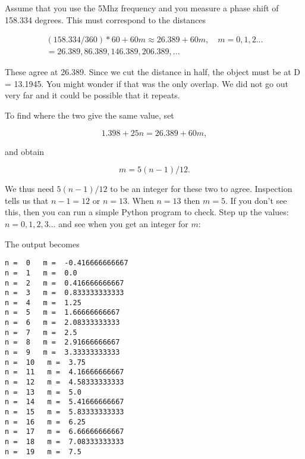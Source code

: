 Assume that you use the 5Mhz frequency and you measure a phase shift of
158.334 degrees. This must correspond to the distances

\[\begin{aligned}
(158.334/360)*60 + 60m \approx 26.389 +60m , \quad m=0,1,2 ...  \\
= 26.389, 86.389, 146.389, 206.389, ...
\end{aligned}\]

These agree at 26.389. Since we cut the distance in half, the object
must be at D = 13.1945. You might wonder if that was the only overlap.
We did not go out very far and it could be possible that it repeats.

To find where the two give the same value, set

\[1.398 + 25n = 26.389 + 60m,\]

and obtain

\[m = 5(n-1)/12.\]

We thus need \(5(n-1)/12\) to be an integer for these two to agree.
Inspection tells us that \(n-1 = 12\) or \(n=13\). When \(n=13\) then
\(m=5\). If you don't see this, then you can run a simple Python program
to check. Step up the values: \(n=0,1,2,3 ...\) and see when you get an
integer for \(m\):

\begin{Shaded}
\begin{Highlighting}[]
\OperatorTok{=} \OperatorTok{:}
\OperatorTok{=} \OperatorTok{*}\OperatorTok{{-}}\NormalTok{)}\OperatorTok{/}
\OperatorTok{,}\OperatorTok{,} \OperatorTok{,}
\end{Highlighting}
\end{Shaded}

The output becomes

\begin{verbatim}
n =  0   m =  -0.416666666667
n =  1   m =  0.0
n =  2   m =  0.416666666667
n =  3   m =  0.833333333333
n =  4   m =  1.25
n =  5   m =  1.66666666667
n =  6   m =  2.08333333333
n =  7   m =  2.5
n =  8   m =  2.91666666667
n =  9   m =  3.33333333333
n =  10   m =  3.75
n =  11   m =  4.16666666667
n =  12   m =  4.58333333333
n =  13   m =  5.0
n =  14   m =  5.41666666667
n =  15   m =  5.83333333333
n =  16   m =  6.25
n =  17   m =  6.66666666667
n =  18   m =  7.08333333333
n =  19   m =  7.5
\end{verbatim}

